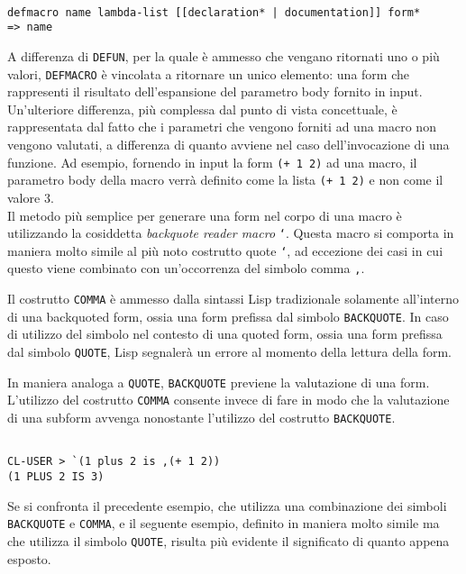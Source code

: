 \begin{lstlisting}[caption=Signature della macro DEFMACRO]

defmacro name lambda-list [[declaration* | documentation]] form*
=> name

\end{lstlisting}

A differenza di \texttt{DEFUN}, per la quale è ammesso che vengano ritornati uno
o più valori, \texttt{DEFMACRO} è vincolata a ritornare un unico elemento: una
form che rappresenti il risultato dell'espansione del parametro body fornito in
input. Un’ulteriore differenza, più complessa dal punto di vista concettuale, è
rappresentata dal fatto che i parametri che vengono forniti ad una macro non
vengono valutati, a differenza di quanto avviene nel caso dell’invocazione di
una funzione. Ad esempio, fornendo in input la form \texttt{(+ 1 2)} ad una
macro, il parametro body della macro verrà definito come la lista \texttt{(+ 1
2)} e non come il valore $3$.\\

Il metodo più semplice per generare una form nel corpo di una macro è
utilizzando la cosiddetta \textit{backquote reader macro} \texttt{`}. Questa
macro si comporta in maniera molto simile al più noto costrutto quote
\texttt{‘}, ad eccezione dei casi in cui questo viene combinato con
un’occorrenza del simbolo comma \texttt{,}.

Il costrutto \texttt{COMMA} è ammesso dalla sintassi Lisp tradizionale solamente
all’interno di una backquoted form, ossia una form prefissa dal simbolo
\texttt{BACKQUOTE}. In caso di utilizzo del simbolo nel contesto di una quoted
form, ossia una form prefissa dal simbolo \texttt{QUOTE}, Lisp segnalerà un
errore al momento della lettura della form.

In maniera analoga a \texttt{QUOTE}, \texttt{BACKQUOTE} previene la valutazione
di una form. L’utilizzo del costrutto \texttt{COMMA} consente invece di fare in
modo che la valutazione di una subform avvenga nonostante l’utilizzo del
costrutto \texttt{BACKQUOTE}.

\begin{lstlisting}

CL-USER > `(1 plus 2 is ,(+ 1 2))
(1 PLUS 2 IS 3)

\end{lstlisting}

Se si confronta il precedente esempio, che utilizza una combinazione dei simboli
\texttt{BACKQUOTE} e \texttt{COMMA}, e il seguente esempio, definito in maniera
molto simile ma che utilizza il simbolo \texttt{QUOTE}, risulta più evidente il
significato di quanto appena esposto.

